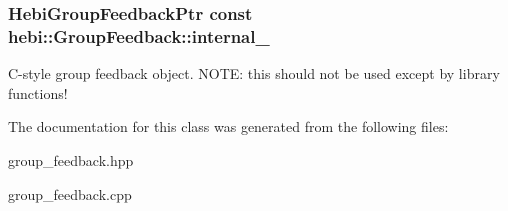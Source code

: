 \subsubsection[{\texorpdfstring{internal\+\_\+}{internal_}}]{\setlength{\rightskip}{0pt plus 5cm}Hebi\+Group\+Feedback\+Ptr const hebi\+::\+Group\+Feedback\+::internal\+\_\+}\hypertarget{classhebi_1_1GroupFeedback_ac549a7728905ca72e5a19256afaf9d49}{}\label{classhebi_1_1GroupFeedback_ac549a7728905ca72e5a19256afaf9d49}
C-\/style group feedback object. N\+O\+TE\+: this should not be used except by library functions! 

The documentation for this class was generated from the following files\+:\begin{DoxyCompactItemize}
\item 
group\+\_\+feedback.\+hpp\item 
group\+\_\+feedback.\+cpp\end{DoxyCompactItemize}
